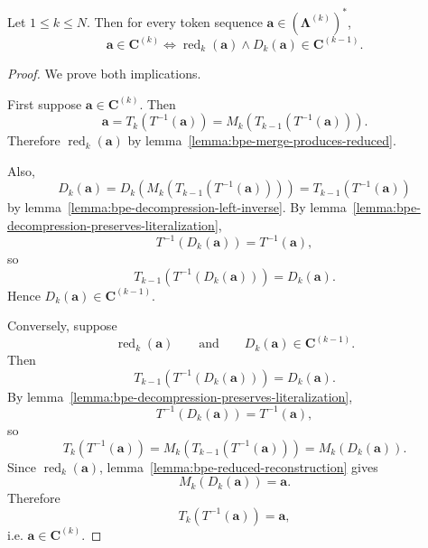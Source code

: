 \begin{theorem}
    \label{thm:bpe-canonical-characterization}
    Let $1 \leq k \leq N$.
    Then for every token sequence $\mathbf{a} \in (\boldsymbol{\Lambda}^{(k)})^*$,
    \[
    \mathbf{a} \in \mathbf{C}^{(k)}
    \iff
    \operatorname{red}_k(\mathbf{a})
    \land
    D_k(\mathbf{a}) \in \mathbf{C}^{(k-1)}.
    \]
\end{theorem}
\begin{proof}
    We prove both implications.

    First suppose $\mathbf{a} \in \mathbf{C}^{(k)}$.
    Then
    \[
    \mathbf{a}
    =
    T_k(T^{-1}(\mathbf{a}))
    =
    M_k(T_{k-1}(T^{-1}(\mathbf{a}))).
    \]
    Therefore $\operatorname{red}_k(\mathbf{a})$ by lemma~\ref{lemma:bpe-merge-produces-reduced}.

    Also,
    \[
    D_k(\mathbf{a})
    =
    D_k(M_k(T_{k-1}(T^{-1}(\mathbf{a}))))
    =
    T_{k-1}(T^{-1}(\mathbf{a}))
    \]
    by lemma~\ref{lemma:bpe-decompression-left-inverse}. By
    lemma~\ref{lemma:bpe-decompression-preserves-literalization},
    \[
    T^{-1}(D_k(\mathbf{a})) = T^{-1}(\mathbf{a}),
    \]
    so
    \[
    T_{k-1}(T^{-1}(D_k(\mathbf{a}))) = D_k(\mathbf{a}).
    \]
    Hence $D_k(\mathbf{a}) \in \mathbf{C}^{(k-1)}$.

    Conversely, suppose
    \[
    \operatorname{red}_k(\mathbf{a})
    \qquad\text{and}\qquad
    D_k(\mathbf{a}) \in \mathbf{C}^{(k-1)}.
    \]
    Then
    \[
    T_{k-1}(T^{-1}(D_k(\mathbf{a}))) = D_k(\mathbf{a}).
    \]
    By lemma~\ref{lemma:bpe-decompression-preserves-literalization},
    \[
    T^{-1}(D_k(\mathbf{a})) = T^{-1}(\mathbf{a}),
    \]
    so
    \[
    T_k(T^{-1}(\mathbf{a}))
    =
    M_k(T_{k-1}(T^{-1}(\mathbf{a})))
    =
    M_k(D_k(\mathbf{a})).
    \]
    Since $\operatorname{red}_k(\mathbf{a})$, lemma~\ref{lemma:bpe-reduced-reconstruction} gives
    \[
    M_k(D_k(\mathbf{a})) = \mathbf{a}.
    \]
    Therefore
    \[
    T_k(T^{-1}(\mathbf{a})) = \mathbf{a},
    \]
    i.e. $\mathbf{a} \in \mathbf{C}^{(k)}$.
\end{proof}

